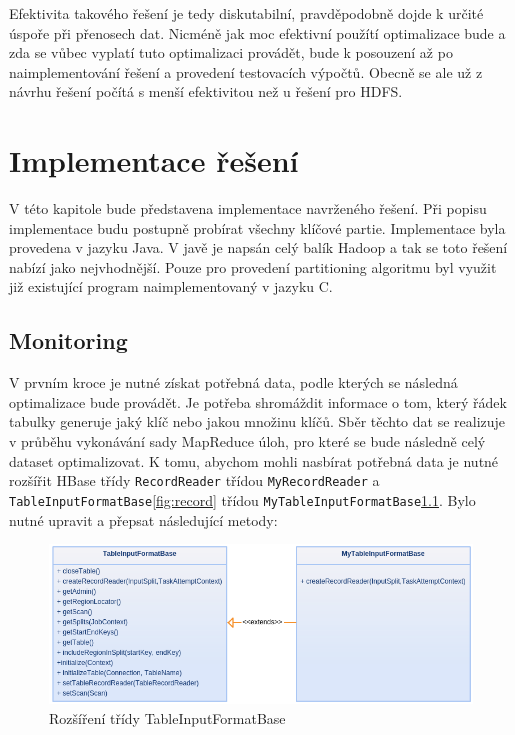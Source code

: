 \documentclass[thesis=M,czech]{FITthesis}[2012/06/26]
\begin{document}
Efektivita takového řešení je tedy diskutabilní, pravděpodobně dojde k určité úspoře při přenosech dat. Nicméně jak moc efektivní použítí optimalizace bude a zda se vůbec vyplatí tuto optimalizaci provádět, bude k posouzení až po naimplementování řešení a provedení testovacích výpočtů. Obecně se ale už z návrhu řešení počítá s menší efektivitou než u řešení pro HDFS. 





\chapter{Implementace řešení}
V této kapitole bude představena implementace navrženého řešení. Při popisu implementace budu postupně probírat všechny klíčové partie. Implementace byla provedena v jazyku Java. V javě je napsán celý balík Hadoop a tak se toto řešení nabízí jako nejvhodnější. Pouze pro provedení partitioning algoritmu byl využit již existující program naimplementovaný v jazyku C. 

\section{Monitoring}
V prvním kroce je nutné získat potřebná data, podle kterých se následná optimalizace bude provádět. Je potřeba shromáždit informace o tom, který řádek tabulky generuje jaký klíč nebo jakou množinu klíčů. Sběr těchto dat se realizuje v průběhu vykonávání sady MapReduce úloh, pro které se bude následně celý dataset optimalizovat. K tomu, abychom mohli nasbírat potřebná data je nutné rozšířit HBase třídy \texttt{RecordReader} třídou \texttt{MyRecordReader} a \texttt{TableInputFormatBase}\ref{fig:record} třídou \texttt{MyTableInputFormatBase}\ref{fig:input}. Bylo nutné upravit a přepsat následující metody:

\begin{figure}\centering
	\includegraphics[width=1\textwidth, angle=0]{files/input}
	\caption[Rozšíření třídy TableInputFormatBase]
	{Rozšíření třídy TableInputFormatBase}\label{fig:input}
\end{figure} 
\end{document}
